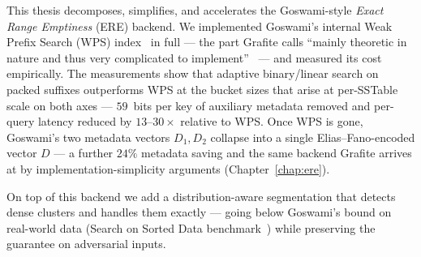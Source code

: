 This thesis decomposes, simplifies, and accelerates the Goswami-style
\emph{Exact Range Emptiness} (ERE) backend.
We implemented Goswami's internal Weak Prefix Search
(WPS) index~\citep{belazzougui2010fast} in full --- the part Grafite
calls ``mainly theoretic in nature and thus very complicated to
implement''~\citep{grafite2024} --- and measured its cost empirically.
The measurements show that adaptive binary/linear search on packed
suffixes outperforms WPS at the bucket sizes that arise at per-SSTable
scale on both axes ---
$59$~bits per key of auxiliary metadata removed and per-query latency
reduced by $13$--$30\times$ relative to WPS.
Once WPS is gone, Goswami's two metadata vectors $D_1, D_2$ collapse
into a single Elias--Fano-encoded vector $D$ --- a further $24\%$
metadata saving and the same backend Grafite arrives at by
implementation-simplicity arguments (Chapter~\ref{chap:ere}).

On top of this backend we add a distribution-aware segmentation that
detects dense clusters and handles them exactly --- going below
Goswami's bound on real-world data (Search on Sorted Data
benchmark~\citep{kipf2019sosd}) while preserving the guarantee on
adversarial inputs.
